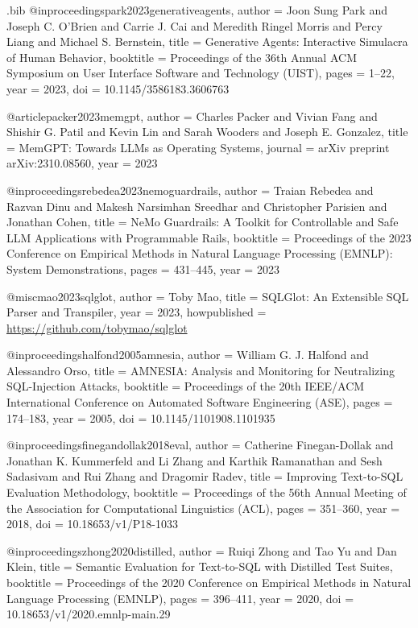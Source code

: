 \begin{filecontents*}{\jobname.bib}
@inproceedings{park2023generativeagents,
  author    = {Joon Sung Park and Joseph C. O'Brien and Carrie J. Cai and Meredith Ringel Morris and Percy Liang and Michael S. Bernstein},
  title     = {Generative Agents: Interactive Simulacra of Human Behavior},
  booktitle = {Proceedings of the 36th Annual ACM Symposium on User Interface Software and Technology (UIST)},
  pages     = {1--22},
  year      = {2023},
  doi       = {10.1145/3586183.3606763}
}

@article{packer2023memgpt,
  author    = {Charles Packer and Vivian Fang and Shishir G. Patil and Kevin Lin and Sarah Wooders and Joseph E. Gonzalez},
  title     = {{MemGPT}: Towards {LLMs} as Operating Systems},
  journal   = {arXiv preprint arXiv:2310.08560},
  year      = {2023}
}

@inproceedings{rebedea2023nemoguardrails,
  author    = {Traian Rebedea and Razvan Dinu and Makesh Narsimhan Sreedhar and Christopher Parisien and Jonathan Cohen},
  title     = {{NeMo} Guardrails: A Toolkit for Controllable and Safe {LLM} Applications with Programmable Rails},
  booktitle = {Proceedings of the 2023 Conference on Empirical Methods in Natural Language Processing (EMNLP): System Demonstrations},
  pages     = {431--445},
  year      = {2023}
}

@misc{mao2023sqlglot,
  author       = {Toby Mao},
  title        = {{SQLGlot}: An Extensible {SQL} Parser and Transpiler},
  year         = {2023},
  howpublished = {\url{https://github.com/tobymao/sqlglot}}
}

@inproceedings{halfond2005amnesia,
  author    = {William G. J. Halfond and Alessandro Orso},
  title     = {{AMNESIA}: Analysis and Monitoring for Neutralizing {SQL}-Injection Attacks},
  booktitle = {Proceedings of the 20th IEEE/ACM International Conference on Automated Software Engineering (ASE)},
  pages     = {174--183},
  year      = {2005},
  doi       = {10.1145/1101908.1101935}
}

@inproceedings{finegandollak2018eval,
  author    = {Catherine Finegan-Dollak and Jonathan K. Kummerfeld and Li Zhang and Karthik Ramanathan and Sesh Sadasivam and Rui Zhang and Dragomir Radev},
  title     = {Improving Text-to-{SQL} Evaluation Methodology},
  booktitle = {Proceedings of the 56th Annual Meeting of the Association for Computational Linguistics (ACL)},
  pages     = {351--360},
  year      = {2018},
  doi       = {10.18653/v1/P18-1033}
}

@inproceedings{zhong2020distilled,
  author    = {Ruiqi Zhong and Tao Yu and Dan Klein},
  title     = {Semantic Evaluation for Text-to-{SQL} with Distilled Test Suites},
  booktitle = {Proceedings of the 2020 Conference on Empirical Methods in Natural Language Processing (EMNLP)},
  pages     = {396--411},
  year      = {2020},
  doi       = {10.18653/v1/2020.emnlp-main.29}
}


\end{filecontents*}
